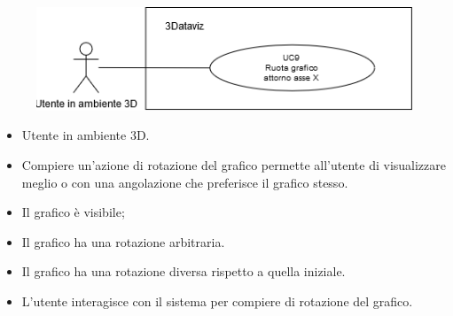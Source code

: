 \begin{figure}[h!]
    \centering
    \includegraphics[scale=0.65]{template/images/UC9.png}
    \caption{}
\end{figure}
\UCdsc
{ %
    \begin{itemize}
        \item Utente in ambiente 3D.
    \end{itemize}
}
{ %
    \begin{itemize}
        \item Compiere un'azione di rotazione del grafico permette all'utente di visualizzare meglio o con una angolazione che preferisce il grafico stesso.
    \end{itemize}
}
{ %
    \begin{itemize}
        \item Il grafico è visibile;
        \item Il grafico ha una rotazione arbitraria.
    \end{itemize}
}
{ %
    \begin{itemize}
        \item Il grafico ha una rotazione diversa rispetto a quella iniziale.
    \end{itemize}
}
{ %
    \begin{itemize}
        \item L'utente interagisce con il sistema per compiere di rotazione del grafico.
    \end{itemize}
}

